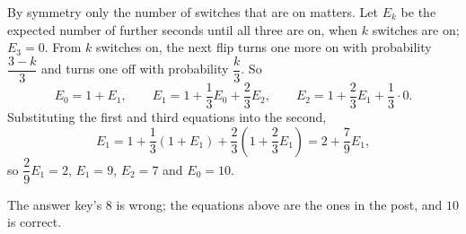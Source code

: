 By symmetry only the number of switches that are on matters. Let $E_k$ be the expected number of further seconds until all three are on, when $k$ switches are on; $E_3=0$. From $k$ switches on, the next flip turns one more on with probability $\dfrac{3-k}{3}$ and turns one off with probability $\dfrac {k}{3}$. So
\[
E_0=1+E_1,\qquad E_1=1+\dfrac{1}{3}E_0+\dfrac{2}{3}E_2,\qquad E_2=1+\dfrac{2}{3}E_1+\dfrac{1}{3}\cdot0 .
\]
Substituting the first and third equations into the second,
\[
E_1=1+\dfrac{1}{3}(1+E_1)+\dfrac{2}{3}\left(1+\dfrac{2}{3}E_1\right)=2+\dfrac{7}{9}E_1,
\]
so $\dfrac{2}{9}E_1=2$, $E_1=9$, $E_2=7$ and $E_0=\boxed{10}$.

The answer key's $8$ is wrong; the equations above are the ones in the post, and $10$ is correct.

